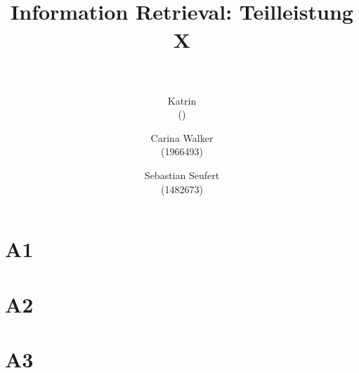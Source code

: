 



\title{	
	\normalfont \normalsize 
	\horrule{0.5pt} \\[0.4cm]
	\huge Information Retrieval: Teilleistung X \\
	\horrule{0.5pt} \\[0.5cm]
}

\author{
	Katrin	\\ \small ()
	\and
	Carina Walker \\ \small (1966493)
	\and
	Sebastian Seufert \\ \small (1482673)
}


\maketitle

\section{A1}


\section{A2}


\section{A3}







